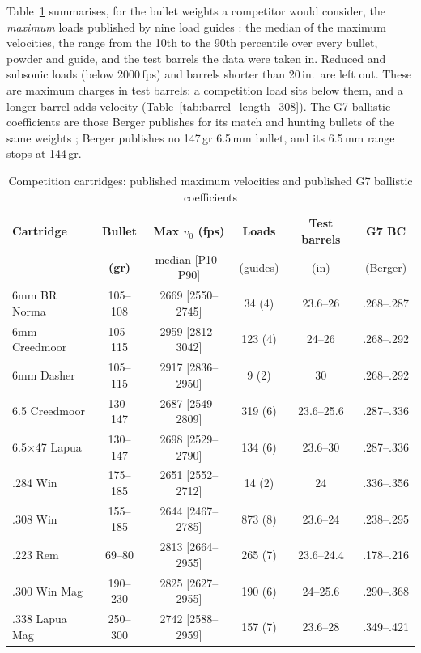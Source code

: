\documentclass[11pt,twoside,openright]{report}
\begin{document}
Table~\ref{tab:cartridges} summarises, for the bullet weights a competitor would consider, the \emph{maximum} loads published by nine load guides \citep{vihtavuori2026,hodgdon2024,western2020,reloadswiss2025,adi2026web,norma2023,lovex2019,lyman2002,sierra2020_6mmbr,sierra2020_65x47}: the median of the maximum velocities, the range from the 10th to the 90th percentile over every bullet, powder and guide, and the test barrels the data were taken in. Reduced and subsonic loads (below 2000\,fps) and barrels shorter than 20\,in.\ are left out. These are maximum charges in test barrels: a competition load sits below them, and a longer barrel adds velocity (Table~\ref{tab:barrel_length_308}). The G7 ballistic coefficients are those Berger publishes for its match and hunting bullets of the same weights \citep{berger_charts}; Berger publishes no 147\,gr 6.5\,mm bullet, and its 6.5\,mm range stops at 144\,gr.

\begin{table}[H]
\centering
\caption{Competition cartridges: published maximum velocities and published G7 ballistic coefficients}
\label{tab:cartridges}
\footnotesize
\setlength{\tabcolsep}{4pt}
\begin{tabular}{@{}lccccc@{}}
\toprule
\textbf{Cartridge} & \textbf{Bullet} & \textbf{Max $v_0$ (fps)} & \textbf{Loads} & \textbf{Test barrels} & \textbf{G7 BC} \\
 & \textbf{(gr)} & median [P10--P90] & (guides) & (in) & (Berger) \\
\midrule
6mm BR Norma & 105--108 & 2669 [2550--2745] & 34 (4) & 23.6--26 & .268--.287 \\
6mm Creedmoor & 105--115 & 2959 [2812--3042] & 123 (4) & 24--26 & .268--.292 \\
6mm Dasher & 105--115 & 2917 [2836--2950] & 9 (2) & 30 & .268--.292 \\
6.5 Creedmoor & 130--147 & 2687 [2549--2809] & 319 (6) & 23.6--25.6 & .287--.336 \\
6.5$\times$47 Lapua & 130--147 & 2698 [2529--2790] & 134 (6) & 23.6--30 & .287--.336 \\
.284 Win & 175--185 & 2651 [2552--2712] & 14 (2) & 24 & .336--.356 \\
.308 Win & 155--185 & 2644 [2467--2785] & 873 (8) & 23.6--24 & .238--.295 \\
.223 Rem & 69--80 & 2813 [2664--2955] & 265 (7) & 23.6--24.4 & .178--.216 \\
.300 Win Mag & 190--230 & 2825 [2627--2955] & 190 (6) & 24--25.6 & .290--.368 \\
.338 Lapua Mag & 250--300 & 2742 [2588--2959] & 157 (7) & 23.6--28 & .349--.421 \\
\bottomrule
\end{tabular}
\end{table}
\end{document}
